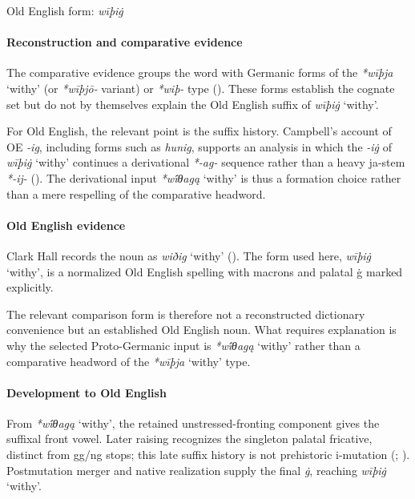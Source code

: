 \documentclass[
  british,
  a4paper,
]{article}
\providecommand{\Recon}[1]{\emph{*#1}}
\begin{document}
Old English form: \emph{wīþiġ}

\paragraph{Reconstruction and comparative
evidence}\label{reconstruction-and-comparative-evidence-114}

The comparative evidence groups the word with Germanic forms of the
\Recon{wīþja} `withy' (or \emph{*wīþjō-} variant) or \emph{*wiþ-} type
(). These forms establish the
cognate set but do not by themselves explain the Old English suffix of
\emph{wīþiġ} `withy'.

For Old English, the relevant point is the suffix history. Campbell's
account of OE \emph{-ig}, including forms such as \emph{hunig}, supports
an analysis in which the \emph{-iġ} of \emph{wīþiġ} `withy' continues a
derivational \emph{*-ag-} sequence rather than a heavy ja-stem
\emph{*-ij-} (). The derivational input \Recon{wī́θagą} `withy' is thus a formation
choice rather than a mere respelling of the comparative headword.

\paragraph{Old English evidence}\label{old-english-evidence-114}

Clark Hall records the noun as {\emph{wiðig}} `withy'
(). The form used
here, {\emph{wīþiġ}} `withy', is a normalized Old English spelling with
macrons and palatal ġ marked explicitly.

The relevant comparison form is therefore not a reconstructed dictionary
convenience but an established Old English noun. What requires
explanation is why the selected Proto-Germanic input is \Recon{wī́θagą}
`withy' rather than a comparative headword of the \Recon{wīþja} `withy'
type.

\paragraph{Development to Old
English}\label{development-to-old-english-114}

From \Recon{wī́θagą} `withy', the retained unstressed-fronting component
gives the suffixal front vowel. Later raising recognizes the singleton
palatal fricative, distinct from gg/ng stops; this late suffix history
is not prehistoric i-mutation (; ).
Postmutation merger and native realization supply the final \emph{ġ},
reaching {\emph{wīþiġ}} `withy'.
\end{document}
